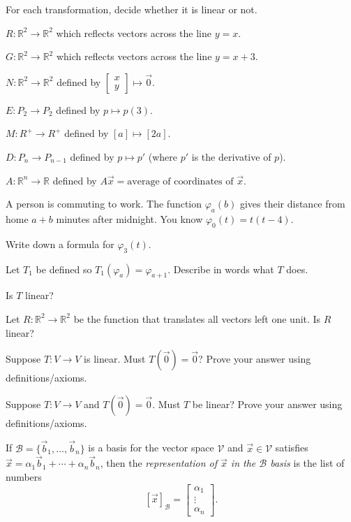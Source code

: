 \documentclass[14pt]{problemset}
\newcommand{\R}{\mathbb{R}}
\newcommand{\mat}[1]{\begin{bmatrix}#1\end{bmatrix}}
\begin{document}
	\question
	For each transformation, decide whether it is linear or not.
	\begin{parts}
		\item $R:\R^2\to\R^2$ which reflects vectors across the line $y=x$.
		\item $G:\R^2\to\R^2$ which reflects vectors across the line $y=x+3$.
		\item $N:\R^2\to\R^2$ defined by $\mat{x\\y}\mapsto \vec 0$.
		\item $E:P_2\to P_2$ defined by $p\mapsto p(3)$.
		\item $M:R^+\to R^+$ defined by $[a]\mapsto [2a]$.
		\item $D:P_n\to P_{n-1}$ defined by $p\mapsto p'$ (where $p'$ is the derivative of $p$).
		\item $A:\R^n\to \R$ defined by $A\vec x=\text{average of coordinates of }\vec x$.
	\end{parts}

	\question
	A person is commuting to work. The function $\varphi_a(b)$ gives their distance from home
	$a+b$ minutes after midnight. You know $\varphi_0(t)=t(t-4)$.
	\begin{parts}
		\item Write down a formula for $\varphi_3(t)$.
		\item Let $T_1$ be defined so $T_1(\varphi_a) = \varphi_{a+1}$. Describe in words what $T$ does.
		\item Is $T$ linear?
		\item Let $R:\R^2\to\R^2$ be the function that translates all vectors left one unit.
			Is $R$ linear?
	\end{parts}

	\question
	\begin{parts}
		\item Suppose $T:V\to V$ is linear. Must $T(\vec 0) = \vec 0$? Prove your answer using definitions/axioms.
		\item Suppose $T:V\to V$ and $T(\vec 0)=\vec 0$. Must $T$ be linear? Prove your answer using definitions/axioms.
	\end{parts}

	\begin{definition}
		If $\mathcal B=\{\vec b_1,\ldots,\vec b_n\}$ is a basis for the vector space $\mathcal V$ and $\vec x\in\mathcal V$
		satisfies $\vec x=\alpha_1\vec b_1+\cdots+\alpha_n\vec b_n$, then the \emph{representation of $\vec x$ in
		the $\mathcal B$ basis} is the list of numbers
		\[
			[\vec x]_{\mathcal B} = \mat{\alpha_1\\\vdots\\\alpha_n}.
		\]
	\end{definition}
\end{document}
